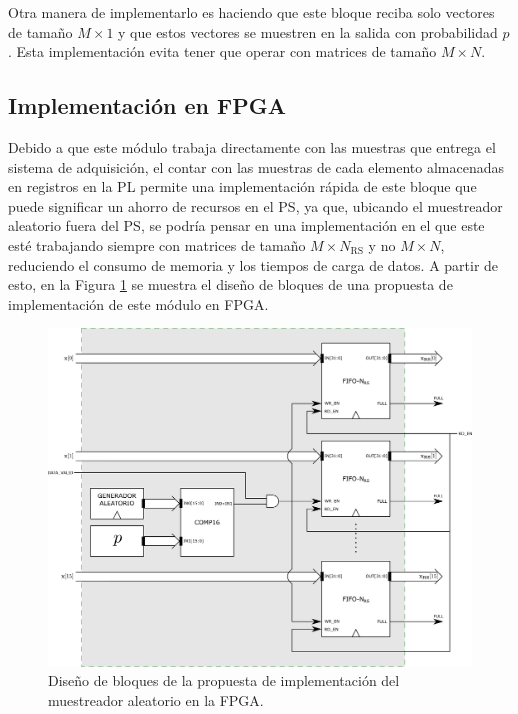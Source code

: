 Otra manera de implementarlo es haciendo que este bloque reciba solo vectores de tamaño $M \times 1$ y que estos vectores se muestren en la salida con probabilidad $p$. Esta implementación evita tener que operar con matrices de tamaño $M \times N$.

\subsection{Implementación en FPGA}

Debido a que este módulo trabaja directamente con las muestras que entrega el sistema de adquisición, el contar con las muestras de cada elemento almacenadas en registros en la PL \cite{bib:jiqdc} permite una implementación rápida de este bloque que puede significar un ahorro de recursos en el PS, ya que, ubicando el muestreador aleatorio fuera del PS, se podría pensar en una implementación en el que este esté trabajando siempre con matrices de tamaño $M\times N_{\textrm{RS}}$ y no $M\times N$, reduciendo el consumo de memoria y los tiempos de carga de datos. A partir de esto, en la Figura \ref{fig:sistema_randomsampler_fpga} se muestra el diseño de bloques de una propuesta de implementación de este módulo en FPGA.

\begin{figure}[ht!]
    \centering
    \includegraphics[width=0.9\linewidth]{images/06-Sistema/sistema_randomsampler_fpga.png}
    \caption{Diseño de bloques de la propuesta de implementación del muestreador aleatorio en la FPGA.}
    \label{fig:sistema_randomsampler_fpga}
\end{figure}

